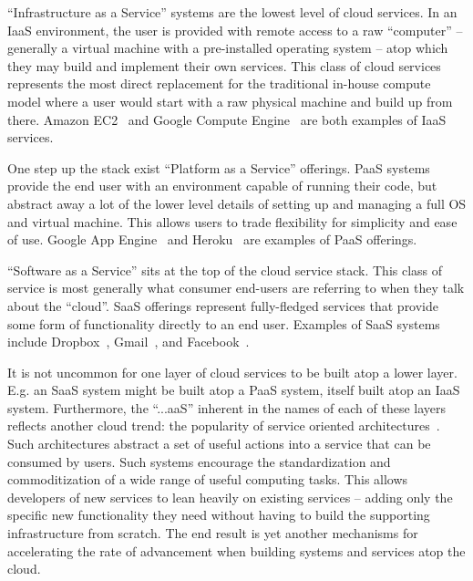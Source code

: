 \begin{packed_desc}
\item[IaaS:] ``Infrastructure as a Service'' systems are the lowest
  level of cloud services. In an IaaS environment, the user is
  provided with remote access to a raw ``computer'' -- generally a
  virtual machine with a pre-installed operating system -- atop which
  they may build and implement their own services. This class of cloud
  services represents the most direct replacement for the traditional
  in-house compute model where a user would start with a raw physical
  machine and build up from there. Amazon EC2~\cite{amazon-ec2} and
  Google Compute Engine~\cite{google-compute} are both examples of IaaS
  services.
\item[PaaS:] One step up the stack exist ``Platform as a Service''
  offerings. PaaS systems provide the end user with an environment
  capable of running their code, but abstract away a lot of the lower
  level details of setting up and managing a full OS and virtual
  machine. This allows users to trade flexibility for simplicity and
  ease of use. Google App Engine~\cite{google-appengine} and
  Heroku~\cite{heroku} are examples of PaaS offerings.
\item[SaaS:] ``Software as a Service'' sits at the top of the cloud
  service stack. This class of service is most generally what consumer
  end-users are referring to when they talk about the ``cloud''. SaaS
  offerings represent fully-fledged services that provide some form of
  functionality directly to an end user. Examples of SaaS systems
  include Dropbox~\cite{dropbox}, Gmail~\cite{google-gmail}, and
  Facebook~\cite{facebook}.
\end{packed_desc}

It is not uncommon for one layer of cloud services to be built atop a
lower layer. E.g. an SaaS system might be built atop a PaaS system,
itself built atop an IaaS system. Furthermore, the ``...aaS'' inherent
in the names of each of these layers reflects another cloud trend: the
popularity of service oriented architectures~\cite{valipour2009}. Such
architectures abstract a set of useful actions into a service that can
be consumed by users. Such systems encourage the standardization and
commoditization of a wide range of useful computing tasks. This allows
developers of new services to lean heavily on existing services --
adding only the specific new functionality they need without having to
build the supporting infrastructure from scratch. The end result is
yet another mechanisms for accelerating the rate of advancement when
building systems and services atop the cloud.

